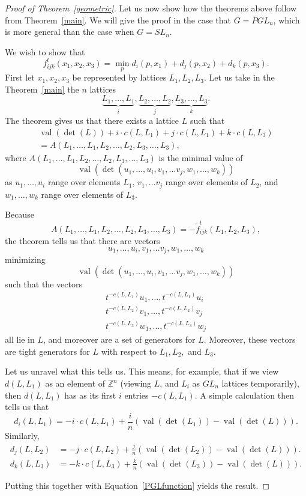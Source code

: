 \documentclass[10pt]{amsart}
\theoremstyle{definition}
\newcommand{\Z}{\mathbb{Z}}
\newcommand{\val}{\operatorname{val}}
\begin{document}
\begin{proof}[Proof of Theorem~\ref{geometric}] Let us now show how the theorems above follow from Theorem~\ref{main}. We will give the proof in the case that $G=PGL_n$, which is more general than the case when $G=SL_n$.




We wish to show that
\[
f_{ijk}^t (x_1,x_2,x_3) = \min_{p} d_i(p,x_1) + d_j(p,x_2) + d_k(p,x_3).
\]
First let $x_1, x_2, x_3$ be represented by lattices $L_1, L_2, L_3.$ Let us take in the Theorem~\ref{main} the $n$ lattices
\[
 \underbrace{L_1,\ldots,L_1}_{i}, \underbrace{L_2,\ldots,L_2}_{j}, \underbrace{L_3,\ldots,L_3}_{k}.
\]
The theorem gives us that there exists a lattice $L$ such that 
\begin{multline}\label{latticeeqn}
\val(\det(L)) + i \cdot c(L,L_1) + j \cdot c(L,L_1) + k \cdot c(L,L_3)\\
= A(L_1, \dots, L_1, L_2, \dots, L_2, L_3, \dots, L_3),
\end{multline}
where $A(L_1, \dots, L_1, L_2, \dots, L_2, L_3, \dots, L_3)$ is the minimal value of
\[
\val(\det(u_1, \dots, u_i, v_1, \dots v_j, w_1, \dots, w_k))
\]
as $u_1, \dots, u_i$ range over elements $L_1$, $v_1, \dots v_j$ range over elements of $L_2$, and $w_1, \dots, w_k$ range over elements of $L_3$.

Because
\[
A(L_1, \dots, L_1, L_2, \dots, L_2, L_3, \dots, L_3)=-\tilde{f}_{ijk}^t (L_1,L_2,L_3),
\]
the theorem tells us that there are vectors
\[
u_1, \dots, u_i, v_1, \dots v_j, w_1, \dots, w_k
\]
minimizing
\[
\val(\det(u_1, \dots, u_i, v_1, \dots v_j, w_1, \dots, w_k))
\]
such that the vectors
\begin{gather*}
t^{-c(L,L_1)}u_1, \dots, t^{-c(L,L_1)}u_i
\\
t^{-c(L,L_2)}v_1, \dots, t^{-c(L,L_2)}v_j
\\
t^{-c(L,L_3)}w_1, \dots, t^{-c(L,L_3)}w_j
\end{gather*}
all lie in $L$, and moreover are a set of generators for $L$. Moreover, these vectors are tight generators for $L$ with respect to $L_1, L_2,$ and $L_3$.

Let us unravel what this tells us. This means, for example, that if we view $d(L,L_1)$ as an element of $\Z^n$ (viewing $L$, and $L_i$ as $GL_n$ lattices temporarily), then $d(L,L_1)$ has as its first $i$ entries $-c(L,L_1)$. A simple calculation then tells us that 
\[
d_i(L,L_1) = -i \cdot c(L,L_1)+\frac{i}{n}(\val(\det(L_1))-\val(\det(L))).
\]
Similarly,
\begin{align*}
d_j(L,L_2) &= -j \cdot c(L,L_2)+\frac{j}{n}(\val(\det(L_2))-\val(\det(L))).
\\
d_k(L,L_3) &= -k \cdot c(L,L_3)+\frac{k}{n}(\val(\det(L_3))-\val(\det(L))).
\end{align*}

Putting this together with Equation~\eqref{PGLfunction} yields the result.
\end{proof}
\end{document}
